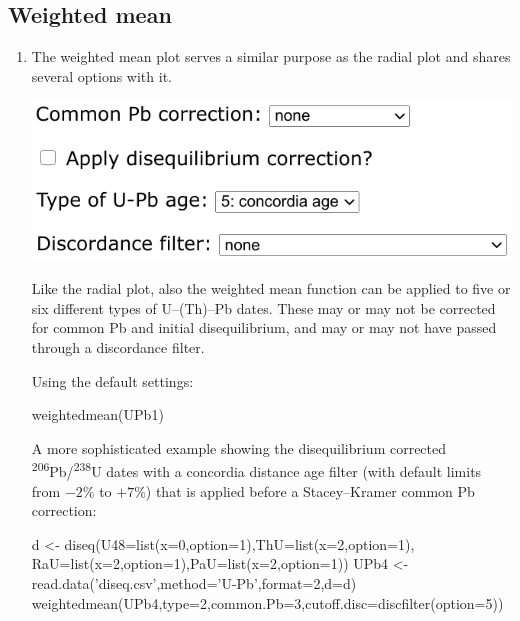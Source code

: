 \begin{refsection}
\section{Weighted mean}
\label{sec:UPbWtdMean}

\begin{enumerate}
\item The weighted mean plot serves a similar purpose as the radial
  plot and shares several options with it.

\noindent\begin{minipage}[t]{.5\linewidth}
\strut\vspace*{-\baselineskip}\newline
\includegraphics[width=\linewidth]{../figures/UPbWtdMeanAgeType.png}
\end{minipage}
\begin{minipage}[t]{.5\linewidth}
  Like the radial plot, also the weighted mean function can be
  applied to five or six different types of U--(Th)--Pb dates. These
  may or may not be corrected for common Pb and initial
  disequilibrium, and may or may not have passed through a discordance
  filter.
\end{minipage}

Using the default settings:
\begin{console}
weightedmean(UPb1)
\end{console}

A more sophisticated example showing the disequilibrium corrected
\textsuperscript{206}Pb/\textsuperscript{238}U dates with a concordia
distance age filter (with default limits from $-2$\% to $+7$\%) that
is applied before a Stacey--Kramer common Pb correction:

\begin{script}
d <- diseq(U48=list(x=0,option=1),ThU=list(x=2,option=1),
           RaU=list(x=2,option=1),PaU=list(x=2,option=1))
UPb4 <- read.data('diseq.csv',method='U-Pb',format=2,d=d)
weightedmean(UPb4,type=2,common.Pb=3,cutoff.disc=discfilter(option=5))
\end{script}


\end{enumerate}
\end{refsection}
